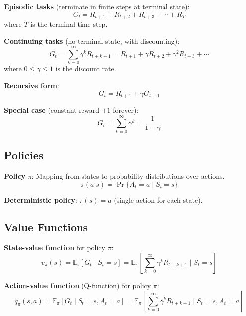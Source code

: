 \documentclass[10pt]{article}
\begin{document}
\textbf{Episodic tasks} (terminate in finite steps at terminal state):
\begin{equation}
G_t = R_{t+1} + R_{t+2} + R_{t+3} + \cdots + R_T
\end{equation}
where $T$ is the terminal time step.

\textbf{Continuing tasks} (no terminal state, with discounting):
\begin{equation}
G_t = \sum_{k=0}^{\infty} \gamma^k R_{t+k+1} = R_{t+1} + \gamma R_{t+2} + \gamma^2 R_{t+3} + \cdots
\end{equation}
where $0 \leq \gamma \leq 1$ is the discount rate.

\textbf{Recursive form}:
\begin{equation}
G_t = R_{t+1} + \gamma G_{t+1}
\end{equation}

\textbf{Special case} (constant reward $+1$ forever):
\begin{equation}
G_t = \sum_{k=0}^{\infty} \gamma^k = \frac{1}{1-\gamma}
\end{equation}

\subsection{Policies}
\textbf{Policy} $\pi$: Mapping from states to probability distributions over actions.
\begin{equation}
\pi(a|s) = \Pr\{A_t=a \mid S_t=s\}
\end{equation}

\textbf{Deterministic policy}: $\pi(s) = a$ (single action for each state).

\subsection{Value Functions}

\textbf{State-value function} for policy $\pi$:
\begin{equation}
v_\pi(s) = \mathbb{E}_\pi[G_t \mid S_t=s] = \mathbb{E}_\pi\left[\sum_{k=0}^{\infty} \gamma^k R_{t+k+1} \;\bigg|\; S_t=s\right]
\end{equation}

\textbf{Action-value function} (Q-function) for policy $\pi$:
\begin{equation}
q_\pi(s,a) = \mathbb{E}_\pi[G_t \mid S_t=s, A_t=a] = \mathbb{E}_\pi\left[\sum_{k=0}^{\infty} \gamma^k R_{t+k+1} \;\bigg|\; S_t=s, A_t=a\right]
\end{equation}
\end{document}
